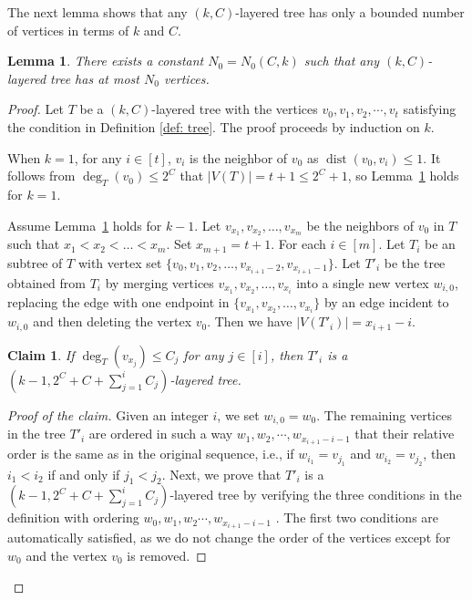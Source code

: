 \documentclass[11pt,a4paper]{article}
\newtheorem{lemma}[definition]{Lemma}
\newtheorem{claim}[definition]{Claim}
\newenvironment{poc}{\begin{proof}[Proof of the claim]\renewcommand*{\qedsymbol}{$\blacksquare$}}{\end{proof}}
\newcommand{\dist}{\operatorname{dist}}
\begin{document}
The next lemma shows that any $(k,C)$-layered tree has only a bounded number of vertices in terms of $k$ and $C$.
\begin{lemma}\label{lem: key}
    There exists a constant $N_0=N_0(C,k)$ such that any $(k,C)$-layered tree has at most $N_0$ vertices.
\end{lemma}
\begin{proof}
    Let $T$ be a $(k,C)$-layered tree with the vertices $v_0,v_1,v_2,\cdots,v_t$ satisfying the condition in Definition \ref{def: tree}.
    The proof proceeds by induction on $k$.
    
    When $k=1$, for any $i\in[t]$, $v_i$ is the neighbor of $v_0$ as $\dist(v_0,v_i) \le 1$. 
    It follows from $\deg_T(v_0) \le 2^C$ that
    $|V(T)| = t+1 \le 2^C+1$, so Lemma~\ref{lem: key} holds for $k=1$.

    Assume Lemma~\ref{lem: key} holds for $k-1$. Let $v_{x_1},v_{x_2}, \dots, v_{x_m}$ be the neighbors of $v_0$ in $T$ such that $x_1 < x_2<\dots < x_m$.
    Set $x_{m+1} = t+1$.
    For each $i\in[m]$.
    Let $T_i$ be an subtree of  $T$ with vertex set $\{v_0,v_1,v_2,\dots, v_{x_{i+1}-2}, v_{x_{i+1}-1}\}$. Let $T'_i$ be the tree obtained from $T_i$ by merging vertices $v_{x_1},v_{x_2}, \dots, v_{x_i}$ into a single new vertex $w_{i,0}$, replacing the edge with one endpoint in $\{v_{x_1},v_{x_2}, \dots, v_{x_i}\}$ by an edge incident to $w_{i,0}$ and then deleting the vertex $v_0$. Then we have $|V(T'_i)| = x_{i+1}-i$.
    \begin{claim}\label{claim: 2.3}
        If $\deg_T(v_{x_j}) \le C_j$ for any $j\in [i]$, then $T'_i$ is a $(k-1,2^C + C + \sum^{i}_{j=1}C_j)$-layered tree.
    \end{claim}
    \begin{poc}
    Given an integer $i$, we set $w_{i,0} = w_0$.
    The remaining vertices in the tree $T'_i$ are ordered in such a way $w_1,w_2,\cdots,w_{x_{i+1}-i-1}$ that their relative order is the same as in the original sequence, i.e., if $w_{i_1} =v_{j_1}$ and $w_{i_2} = v_{j_{2}}$, then $i_1<i_2$ if and only if $j_1<j_2$.
    Next, we prove that $T'_i$ is a $(k-1,2^C + C + \sum^{i}_{j=1}C_j)$-layered tree by verifying the three conditions in the definition with ordering $w_0,w_1,w_2\cdots,w_{x_{i+1}-i-1}$ .
    The first two conditions are automatically satisfied, as we do not change the order of the vertices except for $w_0$ and the vertex $v_0$ is removed. 
    

\end{poc}
\end{proof}
\end{document}
